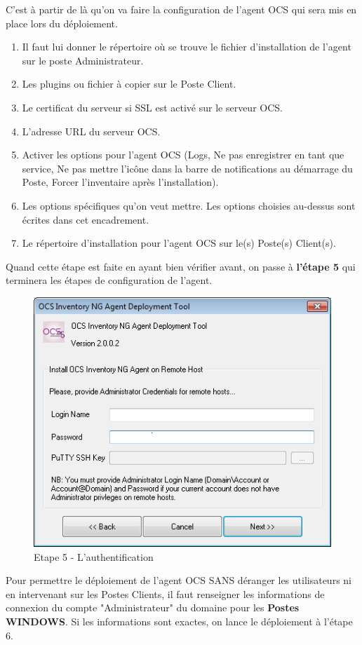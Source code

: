 \documentclass[11pt,a4paper,oneside]{article}
\begin{document}
C'est à partir de là qu'on va faire la configuration de l'agent OCS qui sera mis en place lors du déploiement.  
\begin{enumerate}
\item Il faut lui donner le répertoire où se trouve le fichier d'installation de l'agent sur le poste Administrateur.
\item Les plugins ou fichier à copier sur le Poste Client.
\item Le certificat du serveur si SSL est activé sur le serveur OCS.
\item L'adresse URL du serveur OCS.
\item Activer les options pour l'agent OCS (Logs, Ne pas enregistrer en tant que service, Ne pas mettre l'icône dans la barre de notifications au démarrage du Poste, Forcer l'inventaire après l'installation).
\item Les options spécifiques qu'on veut mettre. Les options choisies au-dessus sont écrites dans cet encadrement.
\item Le répertoire d'installation pour l'agent OCS sur le(s) Poste(s) Client(s).
\end{enumerate}
Quand cette étape est faite en ayant bien vérifier avant, on passe à \textbf{l'étape 5} qui terminera les étapes de configuration de l'agent.
\newpage
\begin{figure}[hbtp]
\centering
\includegraphics[scale=0.9]{Script/5.png}
\caption{Etape 5 - L'authentification}
\end{figure}

Pour permettre le déploiement de l'agent OCS SANS déranger les utilisateurs ni en intervenant sur les Postes Clients, il faut renseigner les informations de connexion du compte "Administrateur" du domaine pour les \textbf{Postes WINDOWS}. Si les informations sont exactes, on lance le déploiement à l'étape 6.
\end{document}
